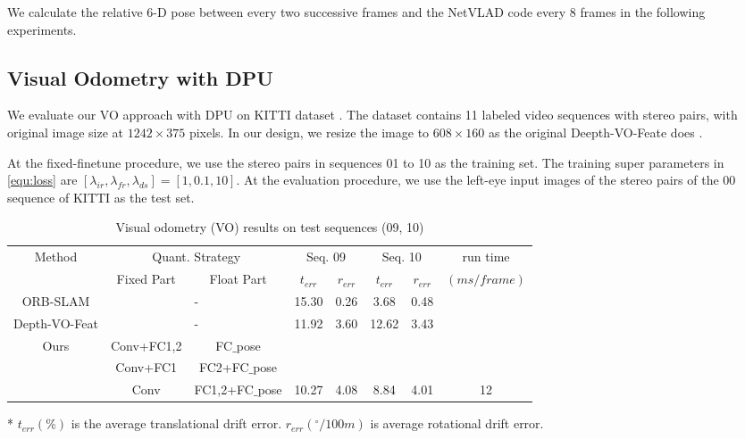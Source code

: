 We calculate the relative 6-D pose between every two successive frames and the NetVLAD code every $8$ frames in the following experiments.

\subsection{Visual Odometry with DPU}

We evaluate our VO approach with DPU on KITTI dataset \cite{geiger2013vision}. The dataset contains 11 labeled video sequences with stereo pairs, with original image size at $1242 \times 375$ pixels. In our design, we resize the image to $608 \times 160$ as the original Deepth-VO-Feate does \cite{Zhan:2018e92}.

At the fixed-finetune procedure, we use the stereo pairs in sequences 01 to 10 as the training set. The training super parameters in \cref{equ:loss} are $[\lambda_{ir},\lambda_{fr},\lambda_{ds}] = [1,0.1,10]$. At the evaluation procedure, we use the left-eye input images of the stereo pairs of the 00 sequence of KITTI as the test set.

\begin{table}[htb]
    \centering
    \caption{Visual odometry (VO) results on test sequences (09, 10)}
    \footnotesize
    \begin{threeparttable}
\begin{tabular}{|c||cc|cc|cc|c|}
  \hline
  \multirow{2}[2]{*}{Method} & \multicolumn{2}{c|}{Quant. Strategy} & \multicolumn{2}{c|}{Seq. 09} & \multicolumn{2}{c|}{Seq. 10} & run time  \bigstrut[t]\\
                             & Fixed Part             & Float Part  & $t_{err}$        & $r_{err}$ & $t_{err}$        & $r_{err}$ & $(ms/frame)$ \bigstrut[b]\\
  \hline
  ORB-SLAM  & \multicolumn{2}{c|}{-} &15.30 &0.26 &3.68 &0.48 &  \bigstrut\\
  \hline
  Depth-VO-Feat\cite{Zhan:2018e92} & \multicolumn{2}{c|}{-} &11.92 &3.60 &12.62 &3.43 &  \bigstrut\\
  \hline
  \multirow{3}[3]{*}{Ours} & Conv+FC1,2 & FC$\_$pose       & & & & & \bigstrut\\
                           & Conv+FC1 & FC2+FC$\_$pose  & & & & & \bigstrut\\
                           & Conv & FC1,2+FC$\_$pose &10.27 &4.08 &8.84 &4.01 & 12 \bigstrut\\
  \hline
  \end{tabular}
  
  \begin{tablenotes}
        \item[*] $t_{err}(\%)$ is the average translational drift error. $r_{err}({}^{\circ}/100m)$ is average rotational drift error.
        \end{tablenotes}
      \end{threeparttable}
    \label{tab:VO}%
  \end{table}%


